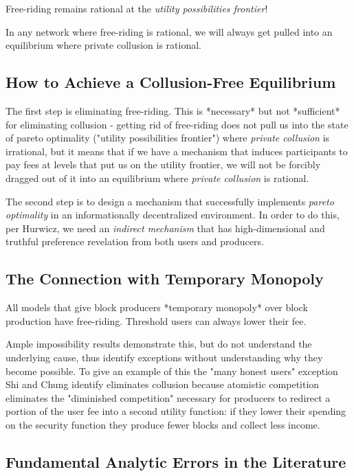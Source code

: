 \documentclass[oneside]{article}   	%
\begin{document}
Free-riding remains rational at the \textit{utility possibilities frontier}!

In any network where free-riding is rational, we will always get pulled into an equilibrium where private collusion is rational.


\subsection*{How to Achieve a Collusion-Free Equilibrium}

The first step is eliminating free-riding. This is *necessary* but not *sufficient* for eliminating collusion - getting rid of free-riding does not pull us into the state of pareto optimality ("utility possibilities frontier") where \textit{private collusion} is irrational, but it means that if we have a mechanism that induces participants to pay fees at levels that put us on the utility frontier, we will not be forcibly dragged out of it into an equilibrium where \textit{private collusion} is rational.

The second step is to design a mechanism that successfully implements \textit{pareto optimality} in an informationally decentralized environment. In order to do this, per Hurwicz, we need an \textit{indirect mechanism} that has high-dimensional and truthful preference revelation from both users and producers.



\subsection*{The Connection with Temporary Monopoly}

All models that give block producers *temporary monopoly* over block production have free-riding. Threshold users can always lower their fee.

Ample impossibility results demonstrate this, but do not understand the underlying cause, thus identify exceptions without understanding why they become possible. To give an example of this the "many honest users" exception Shi and Chung identify eliminates collusion because atomistic competition eliminates the "diminished competition" necessary for producers to redirect a portion of the user fee into a second utility function: if they lower their spending on the security function they produce fewer blocks and collect less income.


\subsection*{Fundamental Analytic Errors in the Literature}
\end{document}
